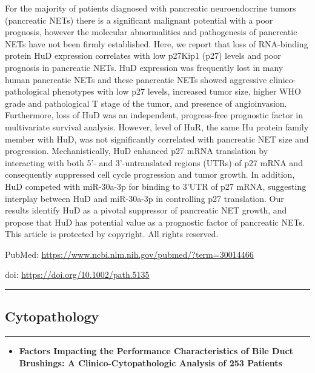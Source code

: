 \documentclass[]{article}
\providecommand{\tightlist}{%
  \setlength{\itemsep}{0pt}\setlength{\parskip}{0pt}}
\begin{document}
For the majority of patients diagnosed with pancreatic neuroendocrine
tumors (pancreatic NETs) there is a significant malignant potential with
a poor prognosis, however the molecular abnormalities and pathogenesis
of pancreatic NETs have not been firmly established. Here, we report
that loss of RNA-binding protein HuD expression correlates with low
p27Kip1 (p27) levels and poor prognosis in pancreatic NETs. HuD
expression was frequently lost in many human pancreatic NETs and these
pancreatic NETs showed aggressive clinico-pathological phenotypes with
low p27 levels, increased tumor size, higher WHO grade and pathological
T stage of the tumor, and presence of angioinvasion. Furthermore, loss
of HuD was an independent, progress-free prognostic factor in
multivariate survival analysis. However, level of HuR, the same Hu
protein family member with HuD, was not significantly correlated with
pancreatic NET size and progression. Mechanistically, HuD enhanced p27
mRNA translation by interacting with both 5'- and 3'-untranslated
regions (UTRs) of p27 mRNA and consequently suppressed cell cycle
progression and tumor growth. In addition, HuD competed with miR-30a-3p
for binding to 3'UTR of p27 mRNA, suggesting interplay between HuD and
miR-30a-3p in controlling p27 translation. Our results identify HuD as a
pivotal suppressor of pancreatic NET growth, and propose that HuD has
potential value as a prognostic factor of pancreatic NETs. This article
is protected by copyright. All rights reserved.

PubMed: \url{https://www.ncbi.nlm.nih.gov/pubmed/?term=30014466}

doi: \url{https://doi.org/10.1002/path.5135}

{}

{}

\begin{center}\rule{0.5\linewidth}{\linethickness}\end{center}

\hypertarget{cytopathology}{%
\subsection{Cytopathology}\label{cytopathology}}

\begin{center}\rule{0.5\linewidth}{\linethickness}\end{center}

\begin{itemize}
\tightlist
\item
  \textbf{Factors Impacting the Performance Characteristics of Bile Duct
  Brushings: A Clinico-Cytopathologic Analysis of 253 Patients}
\end{itemize}
\end{document}
